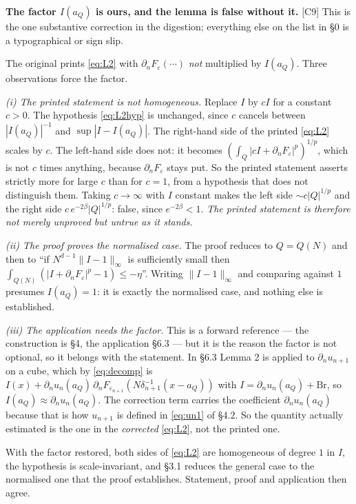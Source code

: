\documentclass[11pt,reqno]{amsart}
\theoremstyle{plain}
\theoremstyle{definition}
\theoremstyle{plain}
\theoremstyle{definition}
\theoremstyle{remark}
\newcommand{\nd}{\partial_n}
\newcommand{\Ledger}[1]{{\scriptsize\textsf{[#1]}}}
\begin{document}
\begin{filled}
\textbf{The factor $I(a_Q)$ is ours, and the lemma is false without it.}
\Ledger{C9} This is the one substantive correction in the digestion; everything
else on the list in \S0 is a typographical or sign slip.

The original prints \eqref{eq:L2} with $\nd F_\varepsilon(\cdots)$ \emph{not}
multiplied by $I(a_Q)$. Three observations force the factor.

\emph{(i) The printed statement is not homogeneous.} Replace $I$ by $cI$ for a
constant $c>0$. The hypothesis \eqref{eq:L2hyp} is unchanged, since $c$ cancels
between $|I(a_Q)|^{-1}$ and $\sup|I-I(a_Q)|$. The right-hand side of the printed
\eqref{eq:L2} scales by $c$. The left-hand side does not: it becomes
$(\int_Q|cI+\nd F_\varepsilon|^p)^{1/p}$, which is not $c$ times anything, because
$\nd F_\varepsilon$ stays put. So the printed statement asserts strictly more for
large $c$ than for $c=1$, from a hypothesis that does not distinguish them. Taking
$c\to\infty$ with $I$ constant makes the left side $\sim c|Q|^{1/p}$ and the right
side $c\,e^{-2\beta}|Q|^{1/p}$: false, since $e^{-2\beta}<1$. \emph{The printed
statement is therefore not merely unproved but untrue as it stands.}

\emph{(ii) The proof proves the normalised case.} The proof reduces to $Q=Q(N)$ and
then to ``if $N^{d-1}\|I-1\|_\infty$ is sufficiently small then
$\int_{Q(N)}(|I+\nd F_\varepsilon|^p-1)\le-\eta$''. Writing $\|I-1\|_\infty$ and
comparing against $1$ presumes $I(a_Q)=1$: it is exactly the normalised case, and
nothing else is established.

\emph{(iii) The application needs the factor.} This is a forward reference --- the
construction is \S4, the application \S6.3 --- but it is the reason the factor is not
optional, so it belongs with the statement. In \S6.3 Lemma 2 is applied to
$\nd u_{n+1}$ on a cube, which by \eqref{eq:decomp} is
$I(x)+\nd u_n(a_Q)\,\nd F_{\varepsilon_{n+1}}(N\delta_{n+1}^{-1}(x-a_Q))$ with
$I=\nd u_n(a_Q)+\mathrm{Br}$, so $I(a_Q)\approx\nd u_n(a_Q)$. The correction term
carries the coefficient $\nd u_n(a_Q)$ because that is how $u_{n+1}$ is defined in
\eqref{eq:un1} of \S4.2. So the quantity actually estimated is the one in the \emph{corrected}
\eqref{eq:L2}, not the printed one.

With the factor restored, both sides of \eqref{eq:L2} are homogeneous of degree $1$
in $I$, the hypothesis is scale-invariant, and \S3.1 reduces the general case to the
normalised one that the proof establishes. Statement, proof and application then
agree.


\end{filled}
\end{document}
